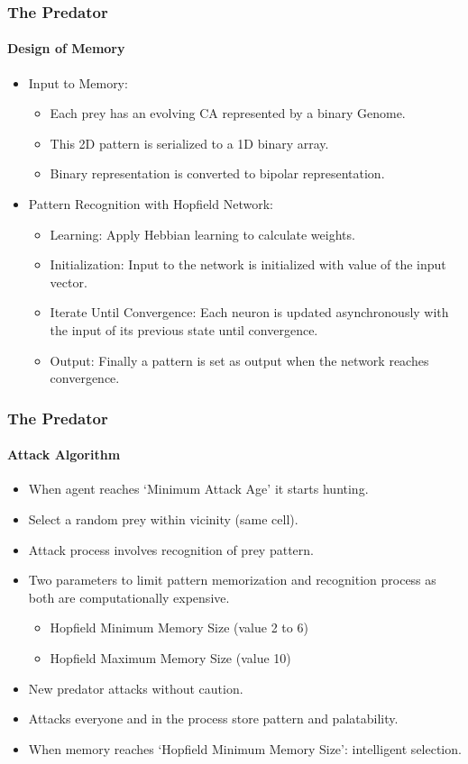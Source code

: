 \frame
{
	\frametitle{The Predator}
	\framesubtitle{Design of Memory}
	
	\begin{itemize}
		\item Input to Memory:
			\begin{itemize}
				\item Each prey has an evolving CA represented by a binary Genome.
				\item This 2D pattern is serialized to a 1D binary array.
				\item Binary representation is converted to bipolar representation.
			\end{itemize}
		\item Pattern Recognition with Hopfield Network:
			\begin{itemize}
				\item Learning: Apply Hebbian learning to calculate weights.
				\item Initialization: Input to the network is initialized with value of the input vector.
				\item Iterate Until Convergence: Each neuron is updated asynchronously with the input of its previous state until convergence.
				\item Output: Finally a pattern is set as output when the network reaches convergence.
			\end{itemize}
	\end{itemize}
}

\frame
{
	\frametitle{The Predator}
	\framesubtitle{Attack Algorithm}
	
	\begin{itemize}
		\item When agent reaches `Minimum Attack Age' it starts hunting.
		\item Select a random prey within vicinity (same cell).
		\item Attack process involves recognition of prey pattern.
		\item Two parameters to limit pattern memorization and recognition process as both are computationally expensive.
			\begin{itemize}
				\item Hopfield Minimum Memory Size (value 2 to 6)
				\item Hopfield Maximum Memory Size (value 10)
			\end{itemize}
		\item New predator attacks without caution. 
		\item Attacks everyone and in the process store pattern and palatability.
		\item When memory reaches `Hopfield Minimum Memory Size': intelligent selection.
	\end{itemize}
}

